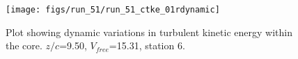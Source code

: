 \begin{figure}[H]
\centering
\texttt{[image: figs/run\_51/run\_51\_ctke\_01rdynamic]}
\caption{Plot showing dynamic variations in turbulent kinetic energy within the core. $z/c$=9.50, $V_{free}$=15.31, station 6.}
\label{fig:run_51_ctke_01rdynamic}
\end{figure}


